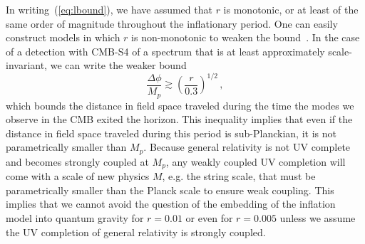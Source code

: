 In writing~(\ref{eq:lbound}), we have assumed that $r$ is monotonic, or at least of the same order of magnitude throughout the inflationary period. One can easily construct models in which $r$ is non-monotonic to weaken the bound~\cite{BenDayan:2009kv,Hotchkiss:2011gz, Chatterjee:2014hna}. In the case of a detection with CMB-S4 of a spectrum that is at least approximately scale-invariant, we can write the weaker bound
\begin{equation}
\frac{\Delta\phi}{M_p}\gtrsim\left(\frac{r}{0.3}\right)^{1/2}\,,
\end{equation}
which bounds the distance in field space traveled during the time the modes we observe in the CMB exited the horizon. This inequality implies that even if the distance in field space traveled during this period is sub-Planckian, it is not parametrically smaller than $M_p$. Because general relativity is not UV complete and becomes strongly coupled at $M_p$, any weakly coupled UV completion will come with a scale of new physics $M$, e.g. the string scale, that must be parametrically smaller than the Planck scale to ensure weak coupling. This implies that we cannot avoid the question of the embedding of the inflation model into quantum gravity for $r=0.01$ or even for $r=0.005$ unless we assume the UV completion of general relativity is strongly coupled. 

